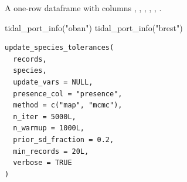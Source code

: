 \documentclass[a4paper]{book}
\begin{document}
%
\begin{Value}
A one-row dataframe with columns , ,
, , , .
\end{Value}
%
\begin{Examples}
\begin{ExampleCode}
tidal_port_info("oban")
tidal_port_info("brest")
\end{ExampleCode}
\end{Examples}
%
\begin{Usage}
\begin{verbatim}
update_species_tolerances(
  records,
  species,
  update_vars = NULL,
  presence_col = "presence",
  method = c("map", "mcmc"),
  n_iter = 5000L,
  n_warmup = 1000L,
  prior_sd_fraction = 0.2,
  min_records = 20L,
  verbose = TRUE
)
\end{verbatim}
\end{Usage}
%
\end{document}
